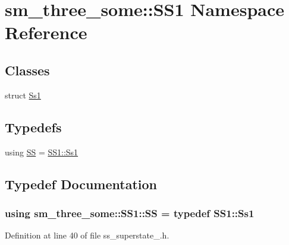 \hypertarget{namespacesm__three__some_1_1SS1}{}\section{sm\+\_\+three\+\_\+some\+:\+:S\+S1 Namespace Reference}
\label{namespacesm__three__some_1_1SS1}
\subsection*{Classes}
\begin{DoxyCompactItemize}
\item 
struct \hyperlink{structsm__three__some_1_1SS1_1_1Ss1}{Ss1}
\end{DoxyCompactItemize}
\subsection*{Typedefs}
\begin{DoxyCompactItemize}
\item 
using \hyperlink{namespacesm__three__some_1_1SS1_ac4d8073976f20771e5e3e2320b19014f}{SS} = \hyperlink{structsm__three__some_1_1SS1_1_1Ss1}{S\+S1\+::\+Ss1}
\end{DoxyCompactItemize}


\subsection{Typedef Documentation}
\subsubsection[{\texorpdfstring{SS}{SS}}]{\setlength{\rightskip}{0pt plus 5cm}using {\bf sm\+\_\+three\+\_\+some\+::\+S\+S1\+::\+SS} = typedef {\bf S\+S1\+::\+Ss1}}\hypertarget{namespacesm__three__some_1_1SS1_ac4d8073976f20771e5e3e2320b19014f}{}\label{namespacesm__three__some_1_1SS1_ac4d8073976f20771e5e3e2320b19014f}


Definition at line 40 of file ss\+\_\+superstate\+\_.\+h.

